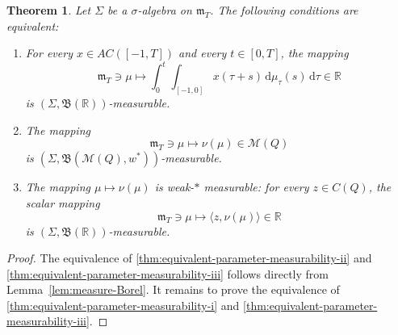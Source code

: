 \documentclass[reqno]{amsart}
\theoremstyle{plain}
\newtheorem{theorem}{Theorem}[section]
\numberwithin{equation}{section}
\numberwithin{definition}{section}
\newcommand{\dd}{\ensuremath{\mathrm{d}}}
\begin{document}
{\begin{theorem}\label{thm:equivalent-parameter-measurability}
Let $\Sigma$ be a $\sigma$-algebra on $\mathfrak m_T$.
The following conditions are equivalent:
\begin{enumerate}[label=\textup{(}\roman*\textup{)}, ref=\textup{(}\emph{\roman*}\textup{)}]
\item\label{thm:equivalent-parameter-measurability-i}    For every $x\in AC([-1,T])$ and every
    $t\in[0,T]$, the mapping
    \begin{equation*}
        \mathfrak m_T\ni\mu
        \mapsto
        \int_0^t\int_{[-1,0]}
        x(\tau+s)\,\dd\mu_\tau(s)\,\dd\tau
        \in\mathbb R
    \end{equation*}
    is $(\Sigma,\mathfrak B(\mathbb R))$-measurable.
\item\label{thm:equivalent-parameter-measurability-ii}The mapping
    \begin{equation*}
        \mathfrak m_T\ni\mu
        \mapsto\nu(\mu)\in\mathcal M(Q)
    \end{equation*}
    is $(\Sigma,\mathfrak B(\mathcal M(Q),w^*))$-measurable.
\item\label{thm:equivalent-parameter-measurability-iii}The mapping $\mu\mapsto\nu(\mu)$ is weak-$*$ measurable:
    for every $z\in C(Q)$, the scalar mapping
    \begin{equation*}
        \mathfrak m_T\ni\mu
        \mapsto\langle z,\nu(\mu)\rangle\in\mathbb R
    \end{equation*}
    is $(\Sigma,\mathfrak B(\mathbb R))$-measurable.
\end{enumerate}
\end{theorem}

\begin{proof}
The equivalence of \ref{thm:equivalent-parameter-measurability-ii} and \ref{thm:equivalent-parameter-measurability-iii} follows directly
from Lemma~\ref{lem:measure-Borel}.
It remains to prove the equivalence of \ref{thm:equivalent-parameter-measurability-i} and \ref{thm:equivalent-parameter-measurability-iii}.


\end{proof}}
\end{document}
